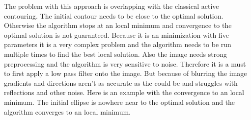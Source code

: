 The problem with this approach is overlapping with the classical active contouring.  The initial contour needs to be close to the optimal solution. Otherwise the algorithm stops at an local minimum and convergence to the optimal solution is not guaranteed. Because it is an minimization with five parameters it is a very complex problem and the algorithm needs to be run multiple times to find the best local solution. Also the image needs strong preprocessing and the algorithm is very sensitive to noise. Therefore it is a must to first apply a low pass filter onto the image. But because of blurring the image gradients and directions aren't as accurate as the could be and struggles with reflections and other noise. Here is an example with the convergence to an local minimum. The initial ellipse is nowhere near to the optimal solution and the algorithm converges to an local minimum. 

